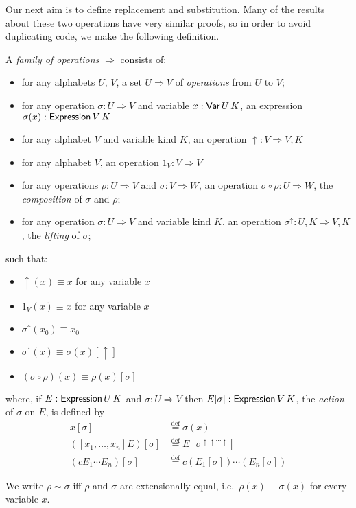 \documentclass[envcountsame]{llncs}
\newcommand{\eqdef}{\ensuremath{\stackrel{\mathrm{def}}{=}}}
\begin{document}
Our next aim is to define replacement and substitution.  Many of the results about these two operations have very similar proofs, so in order to avoid duplicating
code, we make the following definition.

\begin{definition}
 A \emph{family of operations} $\Rightarrow$ consists of:
 \begin{itemize}
  \item for any alphabets $U$, $V$, a set $U \Rightarrow V$ of \emph{operations} from $U$ to $V$;
  \item for any operation $\sigma : U \Rightarrow V$ and variable $x : \AgdaDatatype{Var} \, U \, K$, an expression $\sigma(x) : \AgdaFunction{Expression} \,
  V \, K$ %
  \item for any alphabet $V$ and variable kind $K$, an operation $\uparrow : V \Rightarrow V , K$
  \item for any alphabet $V$, an operation $1_V : V \Rightarrow V$
  \item for any operations $\rho : U \Rightarrow V$ and $\sigma : V \Rightarrow W$, an operation $\sigma \circ \rho : U \Rightarrow W$, the
  \emph{composition} of $\sigma$ and $\rho$;
  \item for any operation $\sigma : U \Rightarrow V$ and variable kind $K$, an operation $\sigma^\uparrow : U , K \Rightarrow V , K$, the \emph{lifting} of $\sigma$;
 \end{itemize}
such that:
\begin{itemize}
 \item $\uparrow(x) \equiv x$ for any variable $x$
 \item $1_V(x) \equiv x$ for any variable $x$
 \item $\sigma^\uparrow(x_0) \equiv x_0$ %
 \item $\sigma^\uparrow(x) \equiv \sigma(x) [ \uparrow ]$
 \item $(\sigma \circ \rho)(x) \equiv \rho(x) [ \sigma ]$
\end{itemize}
where, if $E : \AgdaFunction{Expression} \, U \, K$ and $\sigma : U \Rightarrow V$ then $E [ \sigma ] : \AgdaFunction{Expression} \, V \, K$,
the \emph{action} of $\sigma$ on $E$, is defined by
\begin{eqnarray*}
 x [ \sigma ] & \eqdef \sigma(x) \\
 ([x_1, \ldots, x_n] E) [ \sigma ] & \eqdef E [ \sigma^{\uparrow \uparrow \cdots \uparrow} ] \\
 (c E_1 \cdots E_n) [ \sigma ] & \eqdef c (E_1 [ \sigma ]) \cdots (E_n [ \sigma ])
\end{eqnarray*}

We write $\rho \sim \sigma$ iff $\rho$ and $\sigma$ are extensionally equal, i.e.~$\rho(x) \equiv \sigma(x)$ for every variable $x$.
\end{definition}
\end{document}

